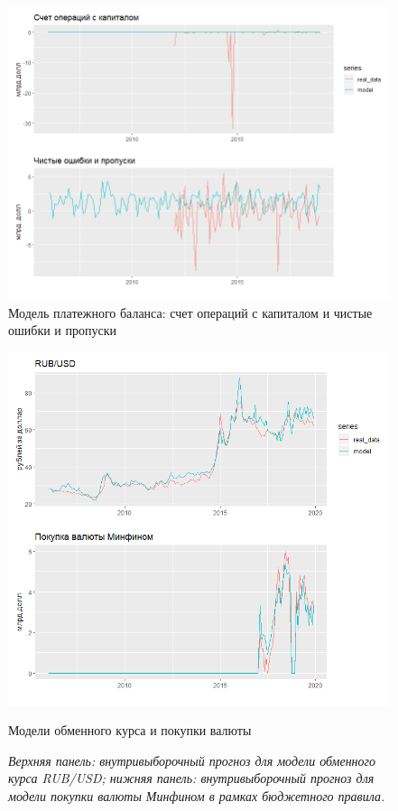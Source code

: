 \documentclass[a4paper, 14pt]{extarticle}
\begin{document}
\begin{figure}[htp!]
	\centering
	\includegraphics[width=19cm]{cap_er.png}
	\captionsetup{justification=centering,margin=0.5cm}
	\caption{Модель платежного баланса: счет операций с капиталом и чистые ошибки и пропуски}\label{fi:4}
\end{figure}

\newpage
\begin{figure}[htp!]
	\centering
\includegraphics[width=19cm]{rub_purch.png}
\caption{Модели обменного курса и покупки валюты}\label{fi:5}
\captionsetup{justification = centering, margin=0cm}
\caption*{\textit{Верхняя панель: внутривыборочный прогноз для модели обменного курса RUB/USD;	
		нижняя панель: внутривыборочный прогноз для модели покупки валюты Минфином в рамках бюджетного правила.}}
\end{figure}
\end{document}
